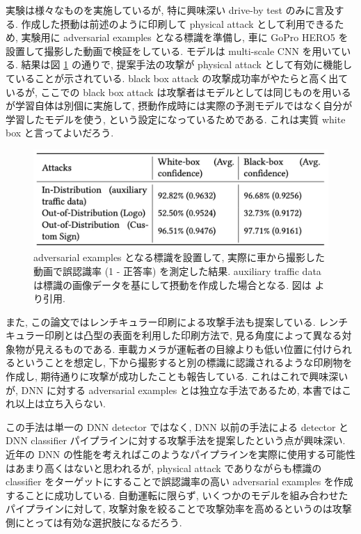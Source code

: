実験は様々なものを実施しているが, 特に興味深い drive-by test のみに言及する.
作成した摂動は前述のように印刷して physical attack として利用できるため, 実験用に adversarial examples となる標識を準備し, 車に GoPro HERO5 を設置して撮影した動画で検証をしている.
モデルは multi-scale CNN \cite{sermanet2011traffic} を用いている.
結果は図 \ref{fig:darts-result-table} の通りで, 提案手法の攻撃が physical attack として有効に機能していることが示されている.
black box attack の攻撃成功率がやたらと高く出ているが, ここでの black box attack は攻撃者はモデルとしては同じものを用いるが学習自体は別個に実施して, 摂動作成時には実際の予測モデルではなく自分が学習したモデルを使う, という設定になっているためである.
これは実質 white box と言ってよいだろう.
%
\begin{figure}[htbp]
\begin{center}
\includegraphics[width=12.0cm]{figures/darts-result-table.pdf}
\end{center}
\caption{
adversarial examples となる標識を設置して, 実際に車から撮影した動画で誤認識率 (1 - 正答率) を測定した結果.
auxiliary traffic data は標識の画像データを基にして摂動を作成した場合となる.
図は \cite{sitawarin2018darts} より引用.
}
\label{fig:darts-result-table}
\end{figure}
%

また, この論文ではレンチキュラー印刷による攻撃手法も提案している.
レンチキュラー印刷とは凸型の表面を利用した印刷方法で, 見る角度によって異なる対象物が見えるものである.
車載カメラが運転者の目線よりも低い位置に付けられるということを想定し, 下から撮影すると別の標識に認識されるような印刷物を作成し, 期待通りに攻撃が成功したことも報告している.
これはこれで興味深いが, DNN に対する adversarial examples とは独立な手法であるため, 本書ではこれ以上は立ち入らない.

この手法は単一の DNN detector ではなく, DNN 以前の手法による detector と DNN classifier パイプラインに対する攻撃手法を提案したという点が興味深い.
近年の DNN の性能を考えればこのようなパイプラインを実際に使用する可能性はあまり高くはないと思われるが, physical attack でありながらも標識の classifier をターゲットにすることで誤認識率の高い adversarial examples を作成することに成功している.
自動運転に限らず, いくつかのモデルを組み合わせたパイプラインに対して, 攻撃対象を絞ることで攻撃効率を高めるというのは攻撃側にとっては有効な選択肢になるだろう.



